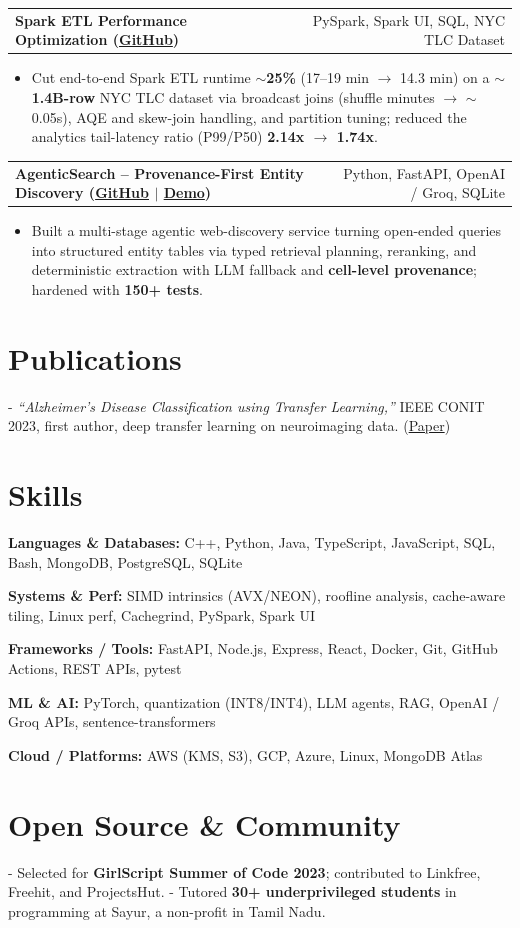 \documentclass[letterpaper,11pt]{article}
\makeatletter
\newcommand{\projItem}[2]{%
  \vspace{2pt}
  \begin{tabular*}{\textwidth}{@{}l@{\extracolsep{\fill}}r@{}}
    \textbf{#1} & #2 \\
  \end{tabular*}\par\vspace{-3pt}
}
\newcommand{\skillLine}[2]{\textbf{#1:} #2\par\vspace{1.5pt}}
\newcommand{\inlineBlock}[1]{{\setlength{\leftskip}{0.18in}\small #1\par}}
\makeatother
\begin{document}
\projItem{Spark ETL Performance Optimization {\normalfont\small(\href{https://github.com/Deva-1903/Spark-ETL-Optimization}{GitHub})}}{PySpark, Spark UI, SQL, NYC TLC Dataset}
\begin{itemize}
  \item Cut end-to-end Spark ETL runtime \textbf{$\sim$25\%} (17--19 min $\to$ 14.3 min) on a \textbf{$\sim$1.4B-row} NYC TLC dataset via broadcast joins (shuffle minutes $\to$ $\sim$0.05s), AQE and skew-join handling, and partition tuning; reduced the analytics tail-latency ratio (P99/P50) \textbf{2.14x $\to$ 1.74x}.
\end{itemize}

\projItem{AgenticSearch -- Provenance-First Entity Discovery {\normalfont\small(\href{https://github.com/Deva-1903/ciir_agentic_search}{GitHub} $\vert$ \href{https://agentic-search-negglszkwa-uc.a.run.app}{Demo})}}{Python, FastAPI, OpenAI / Groq, SQLite}
\begin{itemize}
  \item Built a multi-stage agentic web-discovery service turning open-ended queries into structured entity tables via typed retrieval planning, reranking, and deterministic extraction with LLM fallback and \textbf{cell-level provenance}; hardened with \textbf{150+ tests}.
\end{itemize}

\section{Publications}
\vspace{2pt}
\inlineBlock{- \textit{``Alzheimer's Disease Classification using Transfer Learning,''} IEEE CONIT 2023, first author, deep transfer learning on neuroimaging data. {\normalfont\small(\href{https://ieeexplore.ieee.org/document/10205760}{Paper})}}

\section{Skills}
\skillLine{Languages \& Databases}{C++, Python, Java, TypeScript, JavaScript, SQL, Bash, MongoDB, PostgreSQL, SQLite}
\skillLine{Systems \& Perf}{SIMD intrinsics (AVX/NEON), roofline analysis, cache-aware tiling, Linux perf, Cachegrind, PySpark, Spark UI}
\skillLine{Frameworks / Tools}{FastAPI, Node.js, Express, React, Docker, Git, GitHub Actions, REST APIs, pytest}
\skillLine{ML \& AI}{PyTorch, quantization (INT8/INT4), LLM agents, RAG, OpenAI / Groq APIs, sentence-transformers}
\skillLine{Cloud / Platforms}{AWS (KMS, S3), GCP, Azure, Linux, MongoDB Atlas}

\section{Open Source \& Community}
\inlineBlock{- Selected for \textbf{GirlScript Summer of Code 2023}; contributed to Linkfree, Freehit, and ProjectsHut. - Tutored \textbf{30+ underprivileged students} in programming at Sayur, a non-profit in Tamil Nadu.}
\end{document}
